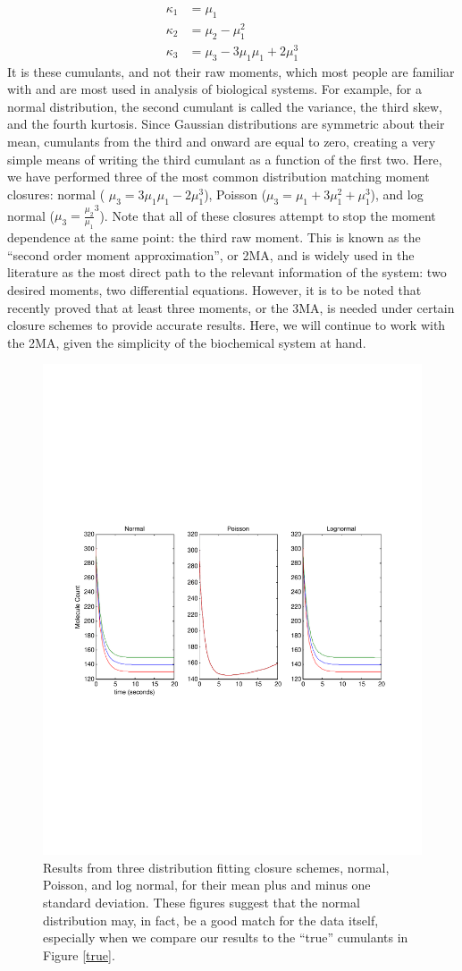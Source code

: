 \documentclass[a4paper,10pt]{article}
\begin{document}
 \begin{align*}
  \kappa_1 &= \mu_1 \\
  \kappa_2 &= \mu_2 - \mu_1^2 \\
  \kappa_3 &= \mu_3 - 3\mu_1\mu_1+2\mu_1^3
 \end{align*}
It is these cumulants, and not their raw moments, which most people are familiar with and are most used in analysis of biological systems. For example, for a normal distribution, the second cumulant is called the variance, the third skew, and the fourth kurtosis. Since Gaussian distributions are symmetric about their mean, cumulants from the third and onward are equal to zero, creating a very simple means of writing the third cumulant as a function of the first two. Here, we have performed three of the most common distribution matching moment closures: normal ( $\mu_3 = 3\mu_1\mu_1-2\mu_1^3$), Poisson ($\mu_3=\mu_1+3\mu_1^2+\mu_1^3$), and log normal ($\mu_3=\frac{\mu_2}{\mu_1}^3$). Note that all of these closures attempt to stop the moment dependence at the same point: the third raw moment. This is known as the ``second order moment approximation'', or 2MA, and is widely used in the literature as the most direct path to the relevant information of the system: two desired moments, two differential equations. However, it is to be noted that \cite{3} recently proved that at least three moments, or the 3MA, is needed under certain closure schemes to provide accurate results. Here, we will continue to work with the 2MA, given the simplicity of the biochemical system at hand.
\begin{figure}[h!]
 \includegraphics[width=\textwidth,height=.7\textwidth]{three_fits.pdf}
 \caption{Results from three distribution fitting closure schemes, normal, Poisson, and log normal, for their mean plus and minus one standard deviation. These figures suggest that the normal distribution may, in fact, be a good match for the data itself, especially when we compare our results to the ``true'' cumulants in Figure  \ref{true}.}
 \label{threefit}
\end{figure}
\end{document}
